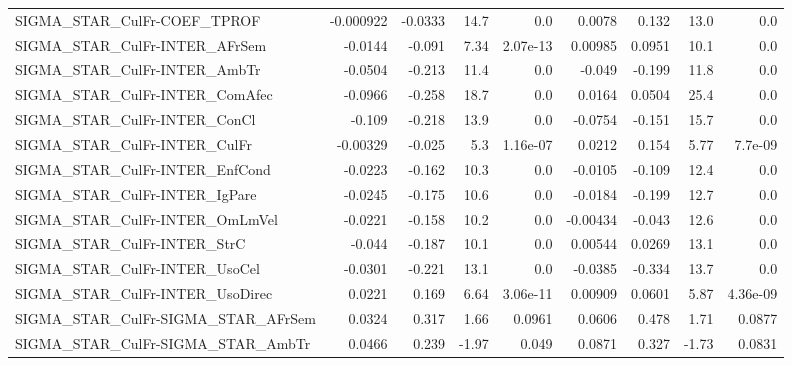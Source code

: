 \begin{tabular}{lrrrrrrrr}
SIGMA\_STAR\_CulFr-COEF\_TPROF            &   -0.000922 &      -0.0333 &     14.7 &      0.0 &     0.0078 &       0.132 &         13.0 &           0.0 \\
SIGMA\_STAR\_CulFr-INTER\_AFrSem          &     -0.0144 &       -0.091 &     7.34 & 2.07e-13 &    0.00985 &      0.0951 &         10.1 &           0.0 \\
SIGMA\_STAR\_CulFr-INTER\_AmbTr           &     -0.0504 &       -0.213 &     11.4 &      0.0 &     -0.049 &      -0.199 &         11.8 &           0.0 \\
SIGMA\_STAR\_CulFr-INTER\_ComAfec         &     -0.0966 &       -0.258 &     18.7 &      0.0 &     0.0164 &      0.0504 &         25.4 &           0.0 \\
SIGMA\_STAR\_CulFr-INTER\_ConCl           &      -0.109 &       -0.218 &     13.9 &      0.0 &    -0.0754 &      -0.151 &         15.7 &           0.0 \\
SIGMA\_STAR\_CulFr-INTER\_CulFr           &    -0.00329 &       -0.025 &      5.3 & 1.16e-07 &     0.0212 &       0.154 &         5.77 &       7.7e-09 \\
SIGMA\_STAR\_CulFr-INTER\_EnfCond         &     -0.0223 &       -0.162 &     10.3 &      0.0 &    -0.0105 &      -0.109 &         12.4 &           0.0 \\
SIGMA\_STAR\_CulFr-INTER\_IgPare          &     -0.0245 &       -0.175 &     10.6 &      0.0 &    -0.0184 &      -0.199 &         12.7 &           0.0 \\
SIGMA\_STAR\_CulFr-INTER\_OmLmVel         &     -0.0221 &       -0.158 &     10.2 &      0.0 &   -0.00434 &      -0.043 &         12.6 &           0.0 \\
SIGMA\_STAR\_CulFr-INTER\_StrC            &      -0.044 &       -0.187 &     10.1 &      0.0 &    0.00544 &      0.0269 &         13.1 &           0.0 \\
SIGMA\_STAR\_CulFr-INTER\_UsoCel          &     -0.0301 &       -0.221 &     13.1 &      0.0 &    -0.0385 &      -0.334 &         13.7 &           0.0 \\
SIGMA\_STAR\_CulFr-INTER\_UsoDirec        &      0.0221 &        0.169 &     6.64 & 3.06e-11 &    0.00909 &      0.0601 &         5.87 &      4.36e-09 \\
SIGMA\_STAR\_CulFr-SIGMA\_STAR\_AFrSem     &      0.0324 &        0.317 &     1.66 &   0.0961 &     0.0606 &       0.478 &         1.71 &        0.0877 \\
SIGMA\_STAR\_CulFr-SIGMA\_STAR\_AmbTr      &      0.0466 &        0.239 &    -1.97 &    0.049 &     0.0871 &       0.327 &        -1.73 &        0.0831 \\

\end{tabular}
